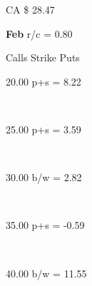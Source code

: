 \documentclass[]{article}
\begin{document}
\vspace{20mm}\Large

		\begin{center}{\parbox[][4.5 mm][t]{40mm}{CA \$ 28.47} \hspace{5mm} \textbf{Feb} \hspace{20mm} r/c = 0.80}\end{center}

		\vspace{5mm}

		\begin{center} {Calls \hspace{28mm} Strike \hspace{26mm} Puts}\end{center}
		\vspace{5mm}
		\large \parbox[][][t]{40mm}{20.00 p+s = 8.22} \hspace{36.5mm} \LARGE \parbox[][][t]{10mm}{} \hspace{55mm} \large \parbox[][][t]{40mm}{\hspace{40mm}} \vspace{6.5mm} \\
		\large \parbox[][][t]{40mm}{25.00 p+s = 3.59} \hspace{36.5mm} \LARGE \parbox[][][t]{10mm}{} \hspace{55mm} \large \parbox[][][t]{40mm}{\hspace{40mm}} \vspace{6.5mm} \\
		\large \parbox[][][t]{40mm}{\hspace{40mm}} \hspace{36.5mm} \LARGE \parbox[][][t]{10mm}{} \hspace{55mm} \large \parbox[][][t]{40mm}{30.00 b/w = 2.82} \vspace{6.5mm} \\
		\large \parbox[][][t]{40mm}{35.00 p+s = -0.59} \hspace{36.5mm} \LARGE \parbox[][][t]{10mm}{} \hspace{55mm} \large \parbox[][][t]{40mm}{\hspace{40mm}} \vspace{6.5mm} \\
		\large \parbox[][][t]{40mm}{\hspace{40mm}} \hspace{36.5mm} \LARGE \parbox[][][t]{10mm}{} \hspace{55mm} \large \parbox[][][t]{40mm}{40.00 b/w = 11.55}
\end{document}
